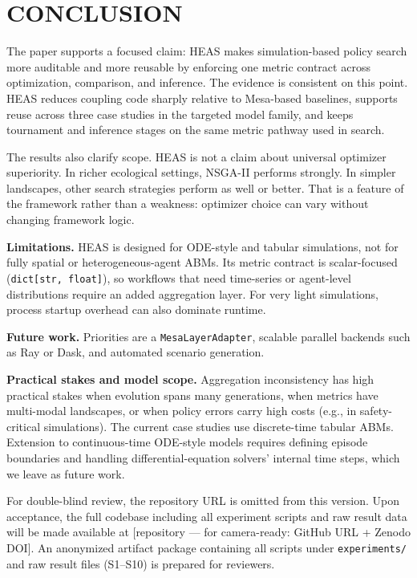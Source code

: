 \documentclass{wscpaperproc}
\begin{document}
\section{CONCLUSION}

The paper supports a focused claim: HEAS makes simulation-based policy search
more auditable and more reusable by enforcing one metric contract across
optimization, comparison, and inference. The evidence is consistent on this
point. HEAS reduces coupling code sharply relative to Mesa-based baselines,
supports reuse across three case studies in the targeted model family, and
keeps tournament and inference stages on the same metric pathway used in search.

The results also clarify scope. HEAS is not a claim about universal optimizer
superiority. In richer ecological settings, NSGA-II performs strongly. In
simpler landscapes, other search strategies perform as well or better. That is
a feature of the framework rather than a weakness: optimizer choice can vary
without changing framework logic.

\textbf{Limitations.} HEAS is designed for ODE-style and tabular simulations,
not for fully spatial or heterogeneous-agent ABMs. Its metric contract is
scalar-focused (\texttt{dict[str, float]}), so workflows that need time-series or
agent-level distributions require an added aggregation layer. For very light
simulations, process startup overhead can also dominate runtime.

\textbf{Future work.} Priorities are a \texttt{MesaLayerAdapter}, scalable
parallel backends such as Ray or Dask, and automated scenario generation.

\textbf{Practical stakes and model scope.} Aggregation inconsistency has high practical stakes when evolution spans many generations, when metrics have multi-modal landscapes, or when policy errors carry high costs (e.g., in safety-critical simulations). The current case studies use discrete-time tabular ABMs. Extension to continuous-time ODE-style models requires defining episode boundaries and handling differential-equation solvers' internal time steps, which we leave as future work.

For double-blind review, the repository URL is omitted from this version.
Upon acceptance, the full codebase including all experiment scripts and raw
result data will be made available at [repository --- for camera-ready: GitHub
URL + Zenodo DOI]. An anonymized artifact package containing all scripts
under \texttt{experiments/} and raw result files (S1--S10) is prepared for
reviewers.
\end{document}
